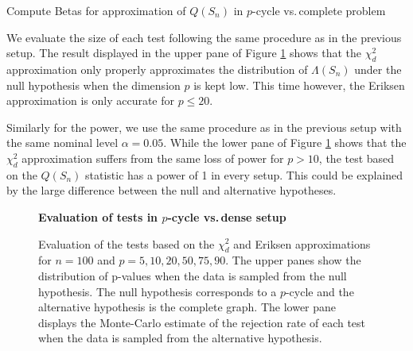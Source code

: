 \begin{algorithm}[t!]
    \caption{Compute Betas for approximation of $Q(S_n)$ in $p$-cycle vs.\,complete problem}
    \label{alg:comp-beta}
    \begin{algorithmic}[1]

                \EndIf
                


            \EndFor
        \EndFor
    \end{algorithmic}
\end{algorithm}

We evaluate the size of each test following the same procedure as in the previous setup. The result displayed in the upper pane of Figure \ref{fig-complete-to-pcycle} shows that the $\chi^2_d$ approximation only properly approximates the distribution of $\Lambda(S_n)$ under the null hypothesis when the dimension $p$ is kept low. This time however, the Eriksen approximation is only accurate for $p \leq 20$.

Similarly for the power, we use the same procedure as in the previous setup with the same nominal level $\alpha = 0.05$. While the lower pane of Figure \ref{fig-complete-to-pcycle} shows that the $\chi^2_d$ approximation suffers from the same loss of power for $p > 10$, the test based on the $Q(S_n)$ statistic has a power of 1 in every setup. This could be explained by the large difference between the null and alternative hypotheses.

\begin{figure}[!tbp]
    \textbf{Evaluation of tests in $p$-cycle vs.\,dense setup}
    \centering
    \qquad
    \caption{Evaluation of the tests based on the $\chi^2_d$ and Eriksen approximations for $n = 100$ and $p = 5, 10, 20, 50, 75, 90$. The upper panes show the distribution of p-values when the data is sampled from the null hypothesis. The null hypothesis corresponds to a $p$-cycle and the alternative hypothesis is the complete graph. The lower pane displays the Monte-Carlo estimate of the rejection rate of each test when the data is sampled from the alternative hypothesis.}
    \label{fig-complete-to-pcycle}
\end{figure}
